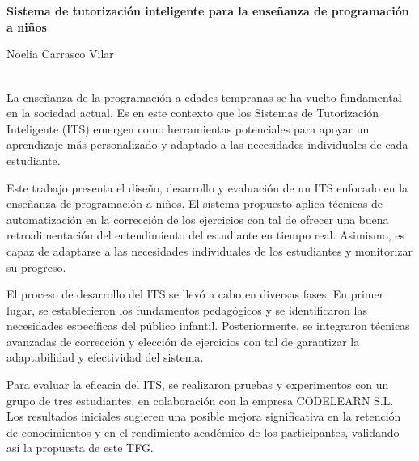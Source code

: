 \chapter*{}
\thispagestyle{empty}
\begin{center}

\large\bfseries Sistema de tutorización inteligente para la enseñanza de programación a niños\\[1cm]

\end{center}

\begin{center}

Noelia Carrasco Vilar \\

\end{center}

\vspace{0.5cm}
\vspace{0.5cm}

\\

La enseñanza de la programación a edades tempranas se ha vuelto fundamental en la sociedad actual. Es en este contexto que los Sistemas de Tutorización Inteligente (ITS) emergen como herramientas potenciales para apoyar un aprendizaje más personalizado y adaptado a las necesidades individuales de cada estudiante.

Este trabajo presenta el diseño, desarrollo y evaluación de un ITS enfocado en la enseñanza de programación a niños. El sistema propuesto aplica técnicas de automatización en la corrección de los ejercicios con tal de ofrecer una buena retroalimentación del entendimiento del estudiante en tiempo real. Asimismo, es capaz de adaptarse a las necesidades individuales de los estudiantes y monitorizar su progreso. 

El proceso de desarrollo del ITS se llevó a cabo en diversas fases. En primer lugar, se establecieron los fundamentos pedagógicos y se identificaron las necesidades específicas del público infantil. Posteriormente, se integraron técnicas avanzadas de corrección y elección de ejercicios con tal de garantizar la adaptabilidad y efectividad del sistema.

Para evaluar la eficacia del ITS, se realizaron pruebas y experimentos con un grupo de tres estudiantes, en colaboración con la empresa CODELEARN S.L. Los resultados iniciales sugieren una posible mejora significativa en la retención de conocimientos y en el rendimiento académico de los participantes, validando así la propuesta de este TFG.

